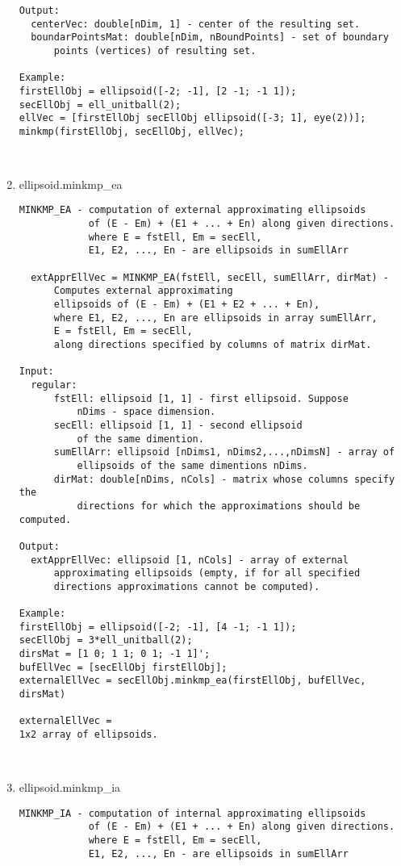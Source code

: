 \begin{enumerate}
\begin{lstlisting}
Output:
  centerVec: double[nDim, 1] - center of the resulting set.
  boundarPointsMat: double[nDim, nBoundPoints] - set of boundary
      points (vertices) of resulting set.

Example:
firstEllObj = ellipsoid([-2; -1], [2 -1; -1 1]);
secEllObj = ell_unitball(2);
ellVec = [firstEllObj secEllObj ellipsoid([-3; 1], eye(2))];
minkmp(firstEllObj, secEllObj, ellVec);



\end{lstlisting}
\fontfamily{\familydefault}
\selectfont
\item {ellipsoid.minkmp\_ea}
\selectfont
\begin{lstlisting}
MINKMP_EA - computation of external approximating ellipsoids
            of (E - Em) + (E1 + ... + En) along given directions.
            where E = fstEll, Em = secEll,
            E1, E2, ..., En - are ellipsoids in sumEllArr

  extApprEllVec = MINKMP_EA(fstEll, secEll, sumEllArr, dirMat) -
      Computes external approximating
      ellipsoids of (E - Em) + (E1 + E2 + ... + En),
      where E1, E2, ..., En are ellipsoids in array sumEllArr,
      E = fstEll, Em = secEll,
      along directions specified by columns of matrix dirMat.

Input:
  regular:
      fstEll: ellipsoid [1, 1] - first ellipsoid. Suppose
          nDims - space dimension.
      secEll: ellipsoid [1, 1] - second ellipsoid
          of the same dimention.
      sumEllArr: ellipsoid [nDims1, nDims2,...,nDimsN] - array of
          ellipsoids of the same dimentions nDims.
      dirMat: double[nDims, nCols] - matrix whose columns specify the
          directions for which the approximations should be computed.

Output:
  extApprEllVec: ellipsoid [1, nCols] - array of external
      approximating ellipsoids (empty, if for all specified
      directions approximations cannot be computed).

Example:
firstEllObj = ellipsoid([-2; -1], [4 -1; -1 1]);
secEllObj = 3*ell_unitball(2);
dirsMat = [1 0; 1 1; 0 1; -1 1]';
bufEllVec = [secEllObj firstEllObj];
externalEllVec = secEllObj.minkmp_ea(firstEllObj, bufEllVec, dirsMat)

externalEllVec =
1x2 array of ellipsoids.



\end{lstlisting}
\fontfamily{\familydefault}
\selectfont
\item {ellipsoid.minkmp\_ia}
\selectfont
\begin{lstlisting}
MINKMP_IA - computation of internal approximating ellipsoids
            of (E - Em) + (E1 + ... + En) along given directions.
            where E = fstEll, Em = secEll,
            E1, E2, ..., En - are ellipsoids in sumEllArr


\end{lstlisting}
\end{enumerate}
